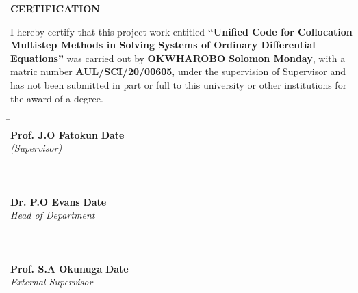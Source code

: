 \documentclass[a4paper, twoside]{report} %
\begin{document}
\begin{titlepage}
  \begin{center}
    \textbf{\huge CERTIFICATION}
\end{center}

\vspace{1cm}

\noindent
I hereby certify that this project work entitled \textbf{“Unified Code for Collocation Multistep Methods in Solving Systems of Ordinary Differential Equations”} was carried out by \textbf{OKWHAROBO Solomon Monday}, with a matric number \textbf{AUL/SCI/20/00605}, under the supervision of Supervisor and has not been submitted in part or full to this university or other institutions for the award of a degree.

\vfill

\noindent
\begin{tabbing}
    \hspace{8cm} \= \hspace{8cm} \kill
    \makebox[6cm]{\hrulefill} \> \makebox[6cm]{\hrulefill} \\
    \textbf{Prof. J.O Fatokun} \> \textbf{Date} \\
    \textit{(Supervisor)} \\
    \\
    \\
    \makebox[6cm]{\hrulefill} \> \makebox[6cm]{\hrulefill} \\
    \textbf{Dr. P.O Evans} \> \textbf{Date} \\
    \textit{Head of Department} \\
    \\
    \\
    \makebox[6cm]{\hrulefill} \> \makebox[6cm]{\hrulefill} \\
    \textbf{Prof. S.A Okunuga} \> \textbf{Date} \\
    \textit{External Supervisor} \\
\end{tabbing}
\end{titlepage}
\end{document}
